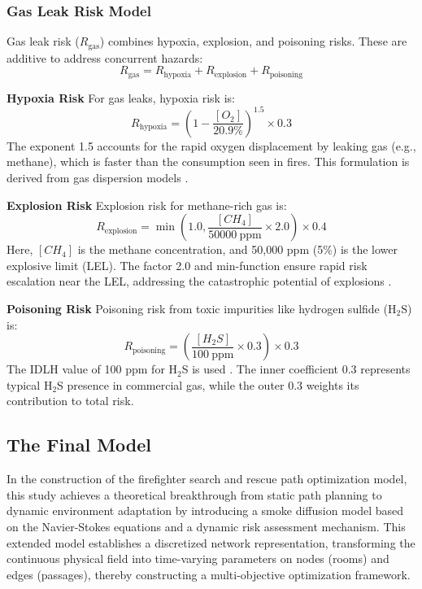 \subsubsection{Gas Leak Risk Model}

Gas leak risk ($R_{\text{gas}}$) combines hypoxia, explosion, and poisoning risks. These are additive to address concurrent hazards:
\begin{equation}
R_{\text{gas}} = R_{\text{hypoxia}} + R_{\text{explosion}} + R_{\text{poisoning}}
\end{equation}

\textbf{Hypoxia Risk}
For gas leaks, hypoxia risk is:
\begin{equation}
R_{\text{hypoxia}} = \left(1 - \frac{[O_2]}{20.9\%}\right)^{1.5} \times 0.3
\end{equation}
The exponent 1.5 accounts for the rapid oxygen displacement by leaking gas (e.g., methane), which is faster than the consumption seen in fires. This formulation is derived from gas dispersion models \cite{GasLeakStudy}.

\textbf{Explosion Risk}
Explosion risk for methane-rich gas is:
\begin{equation}
R_{\text{explosion}} = \min\left(1.0, \frac{[CH_4]}{50000\ \text{ppm}} \times 2.0\right) \times 0.4
\end{equation}
Here, $[CH_4]$ is the methane concentration, and 50,000 ppm (5\%) is the lower explosive limit (LEL). The factor 2.0 and min-function ensure rapid risk escalation near the LEL, addressing the catastrophic potential of explosions \cite{NFPA68}.

\textbf{Poisoning Risk}
Poisoning risk from toxic impurities like hydrogen sulfide (H$_2$S) is:
\begin{equation}
R_{\text{poisoning}} = \left(\frac{[H_2S]}{100\ \text{ppm}} \times 0.3\right) \times 0.3
\end{equation}
The IDLH value of 100 ppm for H$_2$S is used \cite{NIOSH_H2S}. The inner coefficient 0.3 represents typical H$_2$S presence in commercial gas, while the outer 0.3 weights its contribution to total risk.

\subsection{The Final Model}
In the construction of the firefighter search and rescue path optimization model, this study achieves a theoretical breakthrough from static path planning to dynamic environment adaptation by introducing a smoke diffusion model based on the Navier-Stokes equations and a dynamic risk assessment mechanism. This extended model establishes a discretized network representation, transforming the continuous physical field into time-varying parameters on nodes (rooms) and edges (passages), thereby constructing a multi-objective optimization framework.

